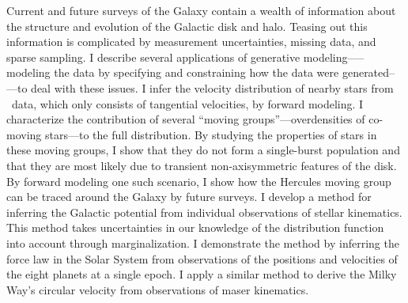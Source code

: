 Current and future surveys of the Galaxy contain a wealth of
information about the structure and evolution of the Galactic disk and
halo. Teasing out this information is complicated by measurement
uncertainties, missing data, and sparse sampling. I describe several
applications of generative modeling--—modeling the data by specifying
and constraining how the data were generated--—to deal with these
issues. I infer the velocity distribution of nearby stars from
\hipparcos\ data, which only consists of tangential velocities, by
forward modeling. I characterize the contribution of several ``moving
groups''---overdensities of co-moving stars---to the full
distribution. By studying the properties of stars in these moving
groups, I show that they do not form a single-burst population and
that they are most likely due to transient non-axisymmetric features
of the disk. By forward modeling one such scenario, I show how the
Hercules moving group can be traced around the Galaxy by future
surveys. I develop a method for inferring the Galactic potential from
individual observations of stellar kinematics. This method takes
uncertainties in our knowledge of the distribution function into
account through marginalization. I demonstrate the method by inferring
the force law in the Solar System from observations of the positions
and velocities of the eight planets at a single epoch. I apply a
similar method to derive the Milky Way's circular velocity from
observations of maser kinematics.
